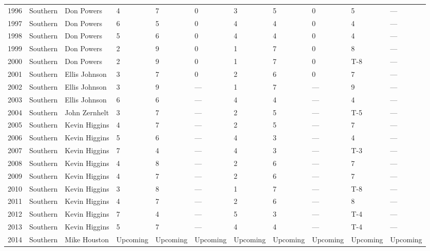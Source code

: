 \documentclass{article}
\begin{document}
\begin{tabular}{lllllllllll}
1996 & Southern & Don Powers & 4 & 7 & 0 & 3 & 5 & 0 & 5 & — \\
1997 & Southern & Don Powers & 6 & 5 & 0 & 4 & 4 & 0 & 4 & — \\
1998 & Southern & Don Powers & 5 & 6 & 0 & 4 & 4 & 0 & 4 & — \\
1999 & Southern & Don Powers & 2 & 9 & 0 & 1 & 7 & 0 & 8 & — \\
2000 & Southern & Don Powers & 2 & 9 & 0 & 1 & 7 & 0 & T-8 & — \\
2001 & Southern & Ellis Johnson & 3 & 7 & 0 & 2 & 6 & 0 & 7 & — \\
2002 & Southern & Ellis Johnson & 3 & 9 & — & 1 & 7 & — & 9 & — \\
2003 & Southern & Ellis Johnson & 6 & 6 & — & 4 & 4 & — & 4 & — \\
2004 & Southern & John Zernhelt & 3 & 7 & — & 2 & 5 & — & T-5 & — \\
2005 & Southern & Kevin Higgins & 4 & 7 & — & 2 & 5 & — & 7 & — \\
2006 & Southern & Kevin Higgins & 5 & 6 & — & 4 & 3 & — & 4 & — \\
2007 & Southern & Kevin Higgins & 7 & 4 & — & 4 & 3 & — & T-3 & — \\
2008 & Southern & Kevin Higgins & 4 & 8 & — & 2 & 6 & — & 7 & — \\
2009 & Southern & Kevin Higgins & 4 & 7 & — & 2 & 6 & — & 7 & — \\
2010 & Southern & Kevin Higgins & 3 & 8 & — & 1 & 7 & — & T-8 & — \\
2011 & Southern & Kevin Higgins & 4 & 7 & — & 2 & 6 & — & 8 & — \\
2012 & Southern & Kevin Higgins & 7 & 4 & — & 5 & 3 & — & T-4 & — \\
2013 & Southern & Kevin Higgins & 5 & 7 & — & 4 & 4 & — & T-4 & — \\
2014 & Southern & Mike Houston & Upcoming & Upcoming & Upcoming & Upcoming & Upcoming & Upcoming & Upcoming & Upcoming \\

\end{tabular}
\end{document}
